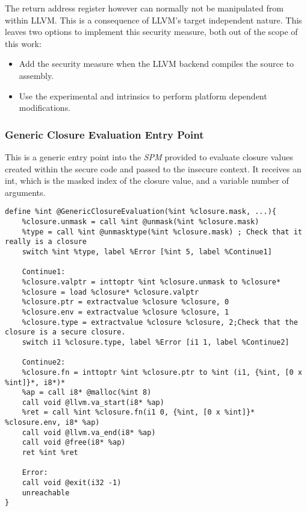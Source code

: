 The return address register however can normally not be manipulated from within LLVM. This is a consequence of LLVM's target independent nature.
This leaves two options to implement this security measure, both out of the scope of this work:
\begin{itemize}
\item 
Add the security measure when the LLVM backend compiles the \LLVMIR source to assembly.

\item 
Use the experimental  and  intrinsics to perform platform dependent modifications.
\end{itemize}


\subsubsection{Generic Closure Evaluation Entry Point}
\label{sec:genericclosureevaluationentrypoint}
This is a generic entry point into the \emph{SPM} provided to evaluate closure values created within the secure code and passed to the insecure context. It receives an int, which is the masked index of the closure value, and a variable number of arguments.

\begin{lstlisting}
define %int @GenericClosureEvaluation(%int %closure.mask, ...){
    %closure.unmask = call %int @unmask(%int %closure.mask)
    %type = call %int @unmasktype(%int %closure.mask) ; Check that it really is a closure
    switch %int %type, label %Error [%int 5, label %Continue1]
    
    Continue1:
    %closure.valptr = inttoptr %int %closure.unmask to %closure*
    %closure = load %closure* %closure.valptr
    %closure.ptr = extractvalue %closure %closure, 0
    %closure.env = extractvalue %closure %closure, 1
    %closure.type = extractvalue %closure %closure, 2;Check that the closure is a secure closure.
    switch i1 %closure.type, label %Error [i1 1, label %Continue2]
    
    Continue2:
    %closure.fn = inttoptr %int %closure.ptr to %int (i1, {%int, [0 x %int]}*, i8*)*
    %ap = call i8* @malloc(%int 8)
    call void @llvm.va_start(i8* %ap)
    %ret = call %int %closure.fn(i1 0, {%int, [0 x %int]}* %closure.env, i8* %ap)
    call void @llvm.va_end(i8* %ap)
    call void @free(i8* %ap)
    ret %int %ret
    
    Error:
    call void @exit(i32 -1)
    unreachable
}
\end{lstlisting}

